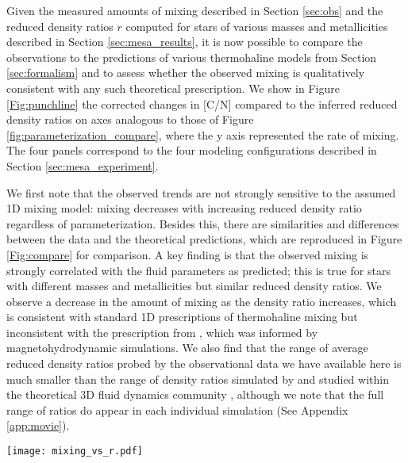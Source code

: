 
Given the measured amounts of mixing described in Section \ref{sec:obs} and the reduced density ratios $r$ computed for stars of various masses and metallicities described in Section \ref{sec:mesa_results}, it is now possible to compare the observations to the predictions of various thermohaline models from Section \ref{sec:formalism} and to assess whether the observed mixing is qualitatively consistent with any such theoretical prescription.
%
We show in Figure \ref{Fig:punchline} the corrected changes in [C/N] compared to the inferred reduced density ratios on axes analogous to those of Figure \ref{fig:parameterization_compare}, where the y axis represented the rate of mixing. 
The four panels correspond to the four modeling configurations described in Section \ref{sec:mesa_experiment}. 

We first note that the observed trends are not strongly sensitive to the assumed 1D mixing model: mixing decreases with increasing reduced density ratio regardless of parameterization.
%
Besides this, there are similarities and differences between the data and the theoretical predictions, which are reproduced in Figure \ref{Fig:compare} for comparison. A key finding is that the observed mixing is strongly correlated with the fluid parameters as predicted; this is true for stars with different masses and metallicities but similar reduced density ratios.
We observe a decrease in the amount of mixing as the density ratio increases, which is consistent with standard 1D prescriptions of thermohaline mixing but inconsistent with the prescription from \citet{harrington}, which was informed by magnetohydrodynamic simulations. 
We also find that the range of average reduced density ratios probed by the observational data we have available here is much smaller than the range of density ratios simulated by and studied within the theoretical 3D fluid dynamics community \citep[e.g.][]{brown_etal_2013}, although we note that the full range of ratios do appear in each individual simulation (See Appendix \ref{app:movie}).

\begin{figure*}[!tb]
\begin{center}
\texttt{[image: mixing\_vs\_r.pdf]}%
\caption{Corrected measurements of the change in [C/N] near the red giant branch bump are compared to the reduced density ratio inferred from one-dimensional models using various thermohaline mixing prescriptions (Brown, Kippenhahn $\alpha_{\rm th}=0.1$, Kippenhahn $\alpha_{\rm th}=0.2$,Kippenhahn $\alpha_{\rm th}=0.700$). Observations are color coded by the metallicity bin of each data point. In general, there is a clear correlation between these parameters, suggesting that the observed mixing may indeed be related to
the unstable mean molecular weight gradient. Mixing and the reduced density ratio $r$ are inversely correlated, which is consistent with hydrodynamic thermohaline prescriptions. 
\label{Fig:punchline}
}
\end{center}
\end{figure*}


